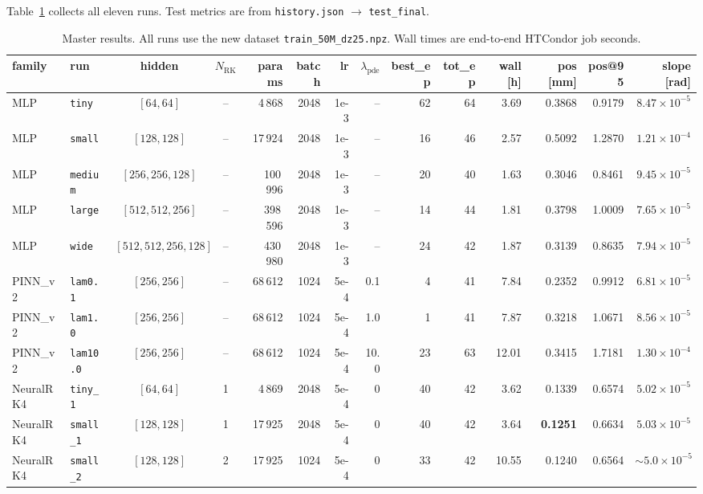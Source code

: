 \documentclass[a4paper,11pt]{article}
\begin{document}
Table~\ref{gen2new:tab:master} collects all eleven runs. Test metrics
are from \texttt{history.json} $\to$ \texttt{test\_final}.

\begin{table}[htbp]
\centering\scriptsize
\caption{Master results. All runs use the new dataset
\texttt{train\_50M\_dz25.npz}. Wall times are end-to-end HTCondor
job seconds.}
\label{gen2new:tab:master}
\setlength{\tabcolsep}{3.5pt}
\begin{tabular}{llccrrrrrrrrrr}
\toprule
family & run & hidden & $N_{\mathrm{RK}}$ & params & batch &
lr & $\lambda_{\mathrm{pde}}$ & best\_ep & tot\_ep &
wall [h] & pos [mm] & pos@95 & slope [rad] \\
\midrule
MLP & \texttt{tiny}         & $[64,64]$          & -- &   4\,868 & 2048 & 1e-3 & -- & 62 & 64 & 3.69  & 0.3868 & 0.9179 & $8.47\!\times\!10^{-5}$ \\
MLP & \texttt{small}        & $[128,128]$        & -- &  17\,924 & 2048 & 1e-3 & -- & 16 & 46 & 2.57  & 0.5092 & 1.2870 & $1.21\!\times\!10^{-4}$ \\
MLP & \texttt{medium}       & $[256,256,128]$    & -- & 100\,996 & 2048 & 1e-3 & -- & 20 & 40 & 1.63  & 0.3046 & 0.8461 & $9.45\!\times\!10^{-5}$ \\
MLP & \texttt{large}        & $[512,512,256]$    & -- & 398\,596 & 2048 & 1e-3 & -- & 14 & 44 & 1.81  & 0.3798 & 1.0009 & $7.65\!\times\!10^{-5}$ \\
MLP & \texttt{wide}         & $[512,512,256,128]$& -- & 430\,980 & 2048 & 1e-3 & -- & 24 & 42 & 1.87  & 0.3139 & 0.8635 & $7.94\!\times\!10^{-5}$ \\
\midrule
PINN\_v2 & \texttt{lam0.1}  & $[256,256]$ & -- & 68\,612 & 1024 & 5e-4 &  0.1 &  4 & 41 & 7.84  & 0.2352 & 0.9912 & $6.81\!\times\!10^{-5}$ \\
PINN\_v2 & \texttt{lam1.0}  & $[256,256]$ & -- & 68\,612 & 1024 & 5e-4 &  1.0 &  1 & 41 & 7.87  & 0.3218 & 1.0671 & $8.56\!\times\!10^{-5}$ \\
PINN\_v2 & \texttt{lam10.0} & $[256,256]$ & -- & 68\,612 & 1024 & 5e-4 & 10.0 & 23 & 63 & 12.01 & 0.3415 & 1.7181 & $1.30\!\times\!10^{-4}$ \\
\midrule
NeuralRK4 & \texttt{tiny\_1}  & $[64,64]$   & 1 &  4\,869 & 2048 & 5e-4 & 0 & 40 & 42 &  3.62 & 0.1339 & 0.6574 & $5.02\!\times\!10^{-5}$ \\
NeuralRK4 & \texttt{small\_1} & $[128,128]$ & 1 & 17\,925 & 2048 & 5e-4 & 0 & 40 & 42 &  3.64 & \textbf{0.1251} & 0.6634 & $5.03\!\times\!10^{-5}$ \\
NeuralRK4 & \texttt{small\_2} & $[128,128]$ & 2 & 17\,925 & 1024 & 5e-4 & 0 & 33 & 42 & 10.55 & 0.1240 & 0.6564 & $\sim\!5.0\!\times\!10^{-5}$ \\
\bottomrule
\end{tabular}
\end{table}
\end{document}
